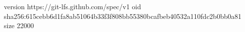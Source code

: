 version https://git-lfs.github.com/spec/v1
oid sha256:615cebb6d1fa8ab51064b33f3f808bb55380bcafbeb40532a110fdc2b0bb0a81
size 22000
